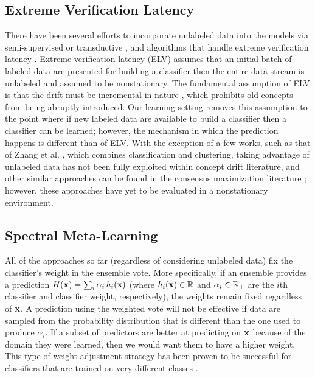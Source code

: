\documentclass[10pt, conference]{IEEEtran}
\begin{document}
\subsection{Extreme Verification Latency}
There have been several efforts to incorporate unlabeled data into the models via semi-supervised or transductive \cite{Ditzler2011IJCNN, Ditzler2012WCCI}, and algorithms that handle extreme verification latency \cite{Souza2015ICDM, Dyer2014TNNLS, Dyer2012IJCNN, Capo2013IJCNN, Sarnelle2015IJCNN, Krempl2011ICDMW, Krempl2011AIDA}.  Extreme verification latency (ELV) assumes that an initial batch of labeled data are presented for building a classifier then the entire data stream is unlabeled and assumed to be nonstationary. The fundamental assumption of ELV is that the drift must be incremental in nature \cite{Sarnelle2015IJCNN, Souza2015ICDM}, which prohibits old concepts from being abruptly introduced. Our learning setting removes this assumption to the point where if new labeled data are available to build a classifier then a classifier can be learned; however, the mechanism in which the prediction happens is different than of ELV. 
With the exception of a few works, such as that of Zhang et al. \cite{Zhang2010ICDM}, which combines classification and clustering, taking advantage of unlabeled data has not been fully exploited within concept drift literature, and other similar approaches can be found in the consensus maximization literature \cite{Dong2014ICDM, Gao2012TKDE, Gao2009NIPS}; however, these approaches have yet to be evaluated in a nonstationary environment.



\subsection{Spectral Meta-Learning}

All of the approaches so far (regardless of considering unlabeled data) fix the classifier's weight in the ensemble  vote. More specifically, if an ensemble provides a prediction $H({\mathbf x}) = \sum_i \alpha_i\,h_i({\mathbf x})$ (where $h_i({\mathbf x}) \in {\mathbb R}$ and $\alpha_i \in {\mathbb R}_{+}$ are the $i$th classifier and classifier weight, respectively), the weights remain fixed regardless of ${\mathbf x}$. 
A prediction using the weighted vote will not be effective if data are sampled from the probability distribution that is different than the one used to produce $\alpha_i$. If a subset of predictors are better at predicting on ${\mathbf x}$ because of the domain they were learned, then we would want them to have a higher weight. This type of weight adjustment strategy has been proven to be successful for classifiers that are trained on very different classes \cite{Ditzler2013IJCNN, Muhlbaier2009TNN}. 
\end{document}
